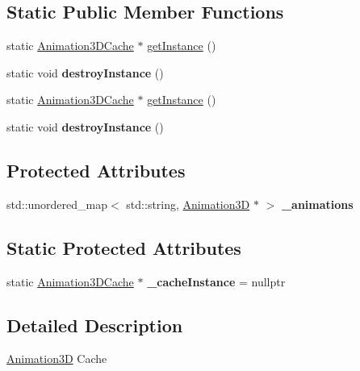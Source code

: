 \subsection*{Static Public Member Functions}
\begin{DoxyCompactItemize}
\item 
static \hyperlink{classAnimation3DCache}{Animation3\+D\+Cache} $\ast$ \hyperlink{classAnimation3DCache_a50a742469d01ac53e566a5a7cf7e1a66}{get\+Instance} ()
\item 
\mbox{\label{classAnimation3DCache_a0f521dc3d684279b1d6aa24a55462ce4}} 
static void {\bfseries destroy\+Instance} ()
\item 
static \hyperlink{classAnimation3DCache}{Animation3\+D\+Cache} $\ast$ \hyperlink{classAnimation3DCache_af94b13774fb9ad1de5ccea4d1d1c8ffa}{get\+Instance} ()
\item 
\mbox{\label{classAnimation3DCache_a917f25cbeea69dfa5ea6421d4dcd69d2}} 
static void {\bfseries destroy\+Instance} ()
\end{DoxyCompactItemize}
\subsection*{Protected Attributes}
\begin{DoxyCompactItemize}
\item 
\mbox{\label{classAnimation3DCache_a1b094bc9bf7858b5bd666d2b3eaf07d9}} 
std\+::unordered\+\_\+map$<$ std\+::string, \hyperlink{classAnimation3D}{Animation3D} $\ast$ $>$ {\bfseries \+\_\+animations}
\end{DoxyCompactItemize}
\subsection*{Static Protected Attributes}
\begin{DoxyCompactItemize}
\item 
\mbox{\label{classAnimation3DCache_ad37ff28e6b1c08f9c2de0586277372f4}} 
static \hyperlink{classAnimation3DCache}{Animation3\+D\+Cache} $\ast$ {\bfseries \+\_\+cache\+Instance} = nullptr
\end{DoxyCompactItemize}


\subsection{Detailed Description}
\hyperlink{classAnimation3D}{Animation3D} Cache 

